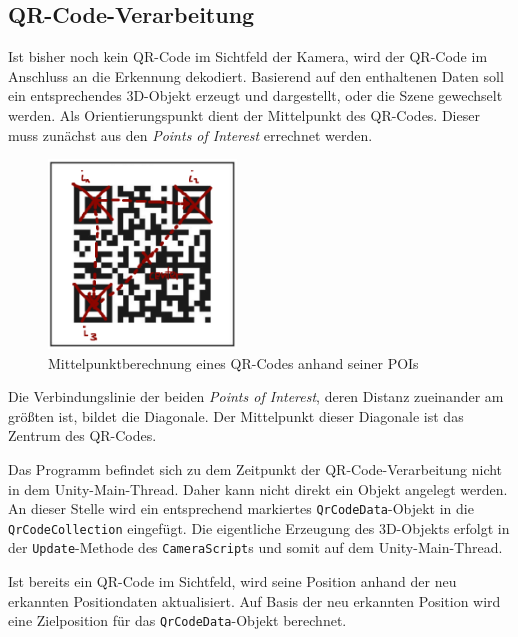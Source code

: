 \subsection{QR-Code-Verarbeitung}
Ist bisher noch kein QR-Code im Sichtfeld der Kamera, wird der QR-Code im Anschluss an die Erkennung dekodiert. Basierend auf den enthaltenen Daten soll ein entsprechendes 3D-Objekt erzeugt und dargestellt, oder die Szene gewechselt werden. Als Orientierungspunkt dient der Mittelpunkt des QR-Codes. Dieser muss zunächst aus den \emph{Points of Interest} errechnet werden.

\begin{figure}[!h]
  \centering
    \includegraphics[width=5cm]{graphics/qr_code_center}
    \caption{Mittelpunktberechnung eines QR-Codes anhand seiner POIs}
    \label{fig:qr_center}
\end{figure}

Die Verbindungslinie der beiden \emph{Points of Interest}, deren Distanz zueinander am größten ist, bildet die Diagonale. Der Mittelpunkt dieser Diagonale ist das Zentrum des QR-Codes.

Das Programm befindet sich zu dem Zeitpunkt der QR-Code-Verarbeitung nicht in dem Unity-Main-Thread. Daher kann nicht direkt ein Objekt angelegt werden. An dieser Stelle wird ein entsprechend markiertes \texttt{QrCodeData}-Objekt in die \texttt{QrCodeCollection} eingefügt. Die eigentliche Erzeugung des 3D-Objekts erfolgt in der \texttt{Update}-Methode des \texttt{CameraScript}s und somit auf dem Unity-Main-Thread.

Ist bereits ein QR-Code im Sichtfeld, wird seine Position anhand der neu erkannten Positiondaten aktualisiert. Auf Basis der neu erkannten Position wird eine Zielposition für das \texttt{QrCodeData}-Objekt berechnet.


